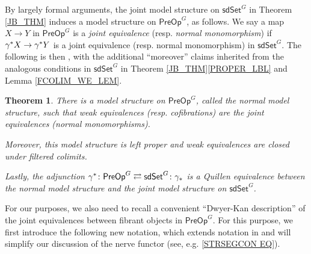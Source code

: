 \documentclass[a4paper,10pt
,draft
]{article}%
\numberwithin{equation}{section}
\numberwithin{figure}{section}
\newtheorem{theorem}[equation]{Theorem}%
\theoremstyle{definition} %
\newcommand{\sdSet}{\mathsf{sdSet}}
\newcommand{\PreOp}{\mathsf{PreOp}}
\newcommand{\1}{\ensuremath{\mathbbm 1}}%
\begin{document}
By largely formal arguments, the joint model structure on 
$\mathsf{sdSet}^G$ in Theorem \ref{JB_THM}
induces a model structure on $\mathsf{PreOp}^G$,
as follows.
%
We say a map $X \to Y$ in $\PreOp^G$ is a 
\textit{joint equivalence} (resp. \textit{normal monomorphism}) if
$\gamma^{\**} X \to \gamma^{\**} Y$ is a joint equivalence 
(resp. normal monomorphism) in $\sdSet^G$.
%
The following is then \cite[Thms. 4.39 and 4.42]{BP_edss},
with the additional ``moreover'' claims 
inherited from the 
analogous conditions in $\mathsf{sdSet}^G$ in
Theorem \ref{JB_THM}\ref{PROPER_LBL}
and Lemma \ref{FCOLIM_WE_LEM}.


\begin{theorem}\label{PREOPMS THM}
	There is a model structure on $\PreOp^G$, called the 
	\emph{normal model structure}, 
	such that weak equivalences (resp. cofibrations) are the joint equivalences (normal monomorphisms).
	
	Moreover, this model structure is left proper
	and weak equivalences are closed under filtered colimits.
	
	Lastly, the adjunction $\gamma^{\**} \colon \PreOp^G \rightleftarrows \sdSet^G \colon \gamma_{\**}$ is a Quillen equivalence
	between the normal model structure and the joint model structure on $\sdSet^G$.
\end{theorem}


For our purposes, we also need to recall
a convenient ``Dwyer-Kan description'' of the joint equivalences
between fibrant objects in $\PreOp^G$.
For this purpose, we first introduce the following new notation,
which extends notation in \cite[Def. 5.7]{BP_edss}
and
will simplify our discussion of the nerve functor
(see, e.g. \eqref{STRSEGCON EQ}).
\end{document}
